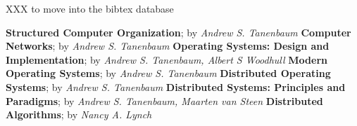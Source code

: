 
%
%

XXX to move into the bibtex database

\begin{thebibliography}{0}
    \textbf{Structured Computer Organization};
    by
    \textit{Andrew S. Tanenbaum}
    \textbf{Computer Networks};
    by
    \textit{Andrew S. Tanenbaum}
    \textbf{Operating Systems: Design and Implementation};
    by
    \textit{Andrew S. Tanenbaum, Albert S Woodhull}
    \textbf{Modern Operating Systems};
    by
    \textit{Andrew S. Tanenbaum}
    \textbf{Distributed Operating Systems};
    by
    \textit{Andrew S. Tanenbaum}
    \textbf{Distributed Systems: Principles and Paradigms};
    by
    \textit{Andrew S. Tanenbaum, Maarten van Steen}
    \textbf{Distributed Algorithms};
    by
    \textit{Nancy A. Lynch}
\end{thebibliography}




